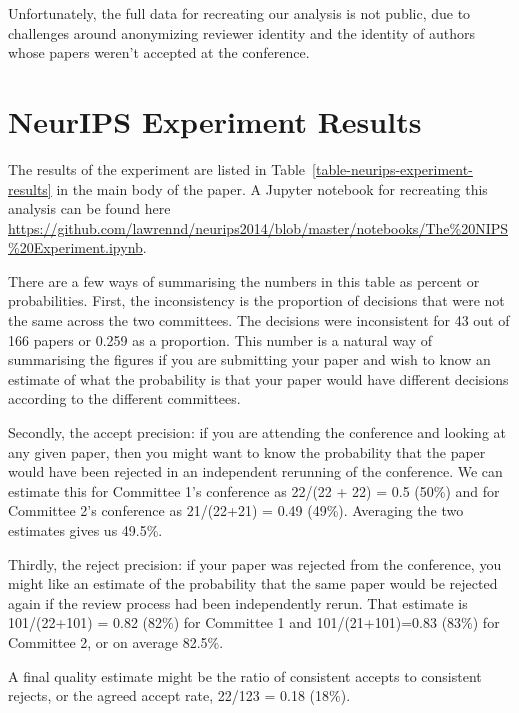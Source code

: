 Unfortunately, the full data for recreating our analysis is not public, due to challenges around anonymizing reviewer identity and the identity of authors whose papers weren't accepted at the conference.

\section{NeurIPS Experiment Results}
\label{app:neurips-experiment-results}

The results of the experiment are listed in Table~\ref{table-neurips-experiment-results} in the main body of the paper. A Jupyter notebook for recreating this analysis can be found here \url{https://github.com/lawrennd/neurips2014/blob/master/notebooks/The%20NIPS%20Experiment.ipynb}.

There are a few ways of summarising the numbers in this table as percent
or probabilities. First, the inconsistency is the proportion of decisions
that were not the same across the two committees. The decisions were
inconsistent for 43 out of 166 papers or 0.259 as a proportion. This
number is a natural way of summarising the figures if you are
submitting your paper and wish to know an estimate of what the
probability is that your paper would have different decisions according
to the different committees. 

Secondly, the accept precision: if you are
attending the conference and looking at any given paper, then you might
want to know the probability that the paper would have been rejected in
an independent rerunning of the conference. We can estimate this for
Committee 1's conference as 22/(22 + 22) = 0.5 (50\%) and for Committee
2's conference as 21/(22+21) = 0.49 (49\%). Averaging the two estimates
gives us 49.5\%. 

Thirdly, the reject precision: if your paper was
rejected from the conference, you might like an estimate of the
probability that the same paper would be rejected again if the review
process had been independently rerun. That estimate is 101/(22+101) =
0.82 (82\%) for Committee 1 and 101/(21+101)=0.83 (83\%) for Committee
2, or on average 82.5\%. 

A final quality estimate might be the ratio of
consistent accepts to consistent rejects, or the agreed accept rate,
22/123 = 0.18 (18\%).

